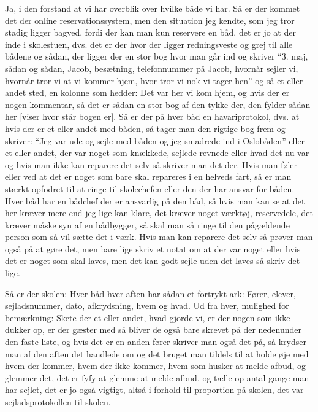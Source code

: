 Ja, i den forstand at vi har overblik over hvilke både vi har. Så er der kommet det der online reservationssystem, men den situation jeg kendte, som jeg tror stadig ligger bagved, fordi der kan man kun reservere en båd, det er jo at der inde i skolestuen, dvs. det er der hvor der ligger redningsveste og grej til alle bådene og sådan, der ligger der en stor bog hvor man går ind og skriver ``3. maj, sådan og sådan, Jacob, besætning, telefonnummer på Jacob, hvornår sejler vi, hvornår tror vi at vi kommer hjem, hvor tror vi nok vi tager hen'' og så et eller andet sted, en kolonne som hedder: Det var her vi kom hjem, og hvis der er nogen kommentar, så det er sådan en stor bog af den tykke der, den fylder sådan her [viser hvor står bogen er]. 
Så er der på hver båd en havariprotokol, dvs. at hvis der er et eller andet med båden, så tager man den rigtige bog frem og skriver: ``Jeg var ude og sejle med båden og jeg smadrede ind i Oslobåden'' eller et eller andet, der var noget som knækkede, sejlede revnede eller hvad det nu var og hvis man ikke kan reparere det selv så skriver man det der. Hvis man føler eller ved at det er noget som bare skal repareres i en helveds fart, så er man stærkt opfodret til at ringe til skolechefen eller den der har ansvar for båden. Hver båd har en bådchef der er ansvarlig på den båd, så hvis man kan se at det her kræver mere end jeg lige kan klare, det kræver noget værktøj, reservedele, det kræver måske syn af en bådbygger, så skal man så ringe til den pågældende person som så vil sætte det i værk. Hvis man kan reparere det selv så prøver man også på at gøre det, men bare lige skriv et notat om at der var noget eller hvis det er noget som skal laves, men det kan godt sejle uden det laves så skriv det lige. 

Så er der skolen: Hver båd hver aften har sådan et fortrykt ark: Fører, elever, sejladsnummer, dato, afkrydsning, hvem og hvad. Ud fra hver, mulighed for bemærkning: Skete der et eller andet, hvad gjorde vi, er der nogen som ikke dukker op, er der gæster med så bliver de også bare skrevet på der nedenunder den faste liste, og hvis det er en anden fører skriver man også det på, så krydser man af den aften det handlede om og det bruget man tildels til at holde øje med hvem der kommer, hvem der ikke kommer, hvem som husker at melde afbud, og glemmer det, det er fyfy at glemme at melde afbud, og tælle op antal gange man har sejlet, det er jo også vigtigt, altså i forhold til proportion på skolen, det var sejladsprotokollen til skolen. 

